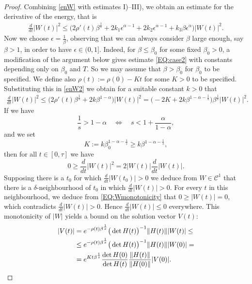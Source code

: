 \documentclass[12pt,oneside,a4paper]{book}
\numberwithin{equation}{section}     %
\theoremstyle{plain}
\theoremstyle{definition}
\begin{document}
\begin{proof}
	Combining \eqref{enW} with estimates I)--III), we obtain an estimate for the derivative of the energy, that is
	\begin{align}\label{enW2}
	\frac{d}{dt}|W(t)|^2\leq \Big(2\rho'(t)\beta^{\frac{1}{s}}+2k_1\epsilon^{\alpha-1}+2k_2 \epsilon^{\alpha-1}+ k_3 \beta \epsilon^\alpha \Big)|W(t)|^2.
	\end{align}
	Now we choose $\epsilon=\frac{1}{\beta}$, observing that we can always consider $\beta$ large enough, say $\beta>1$, in order to have $\epsilon\in(0,1]$. 
	Indeed, for $\beta\leq\beta_0$ for some fixed $\beta_0>0$, a modification of the argument below gives estimate \eqref{EQ:case2} with constants depending only on $\beta_0$ and $T$. So we may assume that $\beta>\beta_0$ for $\beta_0$ to be specified.
	We define also $\rho(t):=\rho(0)-Kt$ for some $K>0$ to be specified. 
	Substituting this in \eqref{enW2} we obtain for a suitable constant $k>0$ that 
	\begin{align*}
	\frac{d}{dt}|W(t)|^2\leq \Big(2\rho'(t)\beta^{\frac{1}{s}}+2k\beta^{1-\alpha}\Big)|W(t)|^2= \big(-2K+2k\beta^{1-\alpha-\frac1s} \big)\beta^{\frac{1}{s}} |W(t)|^2.
	\end{align*}
	If we have
	\[
	\frac{1}{s}>1-\alpha \quad \iff\quad s<1+\frac{\alpha}{1-\alpha},
	\]
	and we set  
	\begin{equation}\label{EQ:Kchoice}
	K:= k\beta_0^{1-\alpha-\frac1s}\geq k\beta^{1-\alpha-\frac1s},
	\end{equation} 
	then for all $t\in[0,\tau]$ we have
	\begin{equation}\label{EQ:Wmonotonicity}
	0\geq\frac{d}{dt}|W(t)|^2=2|W(t)|\frac{d}{dt}|W(t)|.
	\end{equation}
	Supposing there is a $t_0$ for which $\frac{d}{dt}|W(t_0)|>0$ we deduce from $W\in\mathcal{C}^1$ that there is a $\delta$-neighbourhood of $t_0$ in which $\frac{d}{dt}|W(t)|>0$. For every $t$ in this neighbourhood, we deduce from \eqref{EQ:Wmonotonicity} that $0\geq|W(t)|=0$, which contradicts $\frac{d}{dt}|W(t)|>0$. Hence $\frac{d}{dt}|W(t)|\leq0$ everywhere. This monotonicity of $|W|$ yields a bound on the solution vector $V(t)$:
	\begin{align}\notag
	|V(t)|&=e^{-\rho(t)\beta^{\frac{1}{s}}}\big(\det H(t)\big)^{-1}\|H(t)\||W(t)|\leq\\\notag
	&\leq e^{-\rho(t)\beta^{\frac{1}{s}}}\big(\det H(t)\big)^{-1}\|H(t)\||W(0)|=\\
	&=e^{K t\beta^{\frac{1}{s}}}\frac{\det H(0)}{\det H(t)}\frac{\|H(t)\|}{\|H(0)\|}|V(0)|.\label{V}
	\end{align}

\end{proof}
\end{document}
